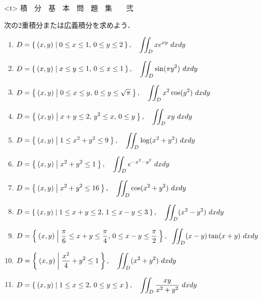 \documentclass[11pt, uplatex, dvipdfmx]{jsarticle}
\newcommand{\ds}{\displaystyle}
\begin{document}
\thispagestyle{empty}


\begin{center}
  \pbox<t>{\Huge \hspace{1.5in} 積　分　基　本　問　題　集　　弐}
\end{center}

\newpage


次の2重積分または広義積分を求めよう．

  \vspace{.2in}

  \begin{enumerate}[(1)]
    \setlength{\itemsep}{.3in}
    
  \item $\ds D=\Set{ (x,y) | 0 \leq x \leq 1, \, 0 \leq y \leq 2}, \quad 
    \iint_D xe^{xy} \ dx dy$
    
  \item $\ds D=\Set{(x,y) | x \leq y \leq1, \, 0 \leq x \leq 1}, \quad
    \iint_D\sin (\pi y^2) \ dx dy$
    
  \item $\ds D=\Set{(x,y)  |  0 \leq x \leq y, \, 0 \leq y \leq \sqrt{\pi} }, \quad
    \iint_D x^2 \cos (y^2) \ dx dy$
    
  \item $\ds D=\Set{(x,y)  |  x+y \leq 2, \, y^2 \leq x, \, 0 \leq y}, \quad 
    \iint_D xy \ dx dy$

  \item $\ds   D=\Set{(x,y)  |  1 \leq x^2+y^2 \leq 9 }, \quad 
    \iint_D \log(x^2+y^2) \ dx dy$
    
  \item $\ds   D=\Set{(x,y) | x^2+y^2 \leq 1}, \quad
    \iint_D e^{-x^2-y^2}  \ dx dy$

  \item $\ds D=\Set{(x,y) | x^2+y^2 \leq 16 }, \quad 
    \iint_D \cos(x^2+y^2) \ dx dy$
    
  \item $\ds D=\Set{(x,y) | 1 \leq x+y \leq 2, \, 1 \leq x-y \leq 3 }, \quad
    \iint_D (x^2-y^2) \ dx dy$
    
  \item $\ds D=\Set{(x,y) | \frac{\pi}{6} \leq x+y \leq \frac{\pi}{4},
      \, 0 \leq x-y \leq \frac{\pi}{2} }, \; \;
    \iint_D (x-y)\tan(x+y) \ dx dy$
    
  \item $\ds D=\Set{ (x,y) | \frac{x^2}{4} + y^2 \leq 1 }, \quad
    \iint_D(x^2+y^2) \ dx dy $
    
  \item $\ds D=\Set{ (x,y) | 1 \leq x \leq 2, \, 0 \leq y \leq x }, \quad
    \iint_D \frac{xy}{x^2+y^2} \ dx dy$
    

\end{enumerate}
\end{document}
